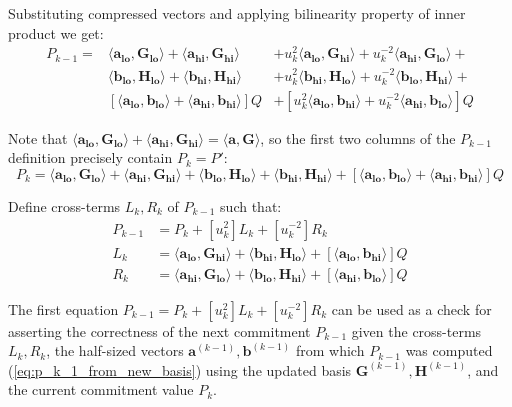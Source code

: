 \documentclass[../../book.tex]{subfiles}
\begin{document}
Substituting compressed vectors and applying bilinearity property of inner product we get:
\begin{align*}
    P_{k-1} = & \langle \mathbf{a_{lo}}, \mathbf{G_{lo}}\rangle + \langle \mathbf{a_{hi}}, \mathbf{G_{hi}}\rangle &+ u_k^2\langle \mathbf{a_{lo}}, \mathbf{G_{hi}}\rangle + u_k^{-2}\langle \mathbf{a_{hi}}, \mathbf{G_{lo}}\rangle + \\
    & \langle \mathbf{b_{lo}}, \mathbf{H_{lo}}\rangle + \langle \mathbf{b_{hi}}, \mathbf{H_{hi}}\rangle &+ u_k^2\langle \mathbf{b_{hi}}, \mathbf{H_{lo}}\rangle + u_k^{-2}\langle \mathbf{b_{lo}}, \mathbf{H_{hi}}\rangle + \\
    & [\langle \mathbf{a_{lo}}, \mathbf{b_{lo}}\rangle + \langle \mathbf{a_{hi}}, \mathbf{b_{hi}}\rangle]Q &+ [u_k^2\langle \mathbf{a_{lo}}, \mathbf{b_{hi}}\rangle + u_k^{-2}\langle \mathbf{a_{hi}}, \mathbf{b_{lo}}\rangle]Q
\end{align*}

Note that $\langle \mathbf{a_{lo}}, \mathbf{G_{lo}}\rangle + \langle \mathbf{a_{hi}}, \mathbf{G_{hi}}\rangle = \langle \mathbf{a,G}\rangle$, so the first two columns of the $P_{k-1}$ definition precisely contain $P_{k} = P'$:
$$P_{k} = \langle \mathbf{a_{lo}}, \mathbf{G_{lo}}\rangle + \langle \mathbf{a_{hi}}, \mathbf{G_{hi}}\rangle + \langle \mathbf{b_{lo}}, \mathbf{H_{lo}}\rangle + \langle \mathbf{b_{hi}}, \mathbf{H_{hi}}\rangle + [\langle \mathbf{a_{lo}}, \mathbf{b_{lo}}\rangle + \langle \mathbf{a_{hi}}, \mathbf{b_{hi}}\rangle]Q$$

Define cross-terms $L_k, R_k$ of $P_{k-1}$ such that:
\begin{align*}
    P_{k-1} &= P_k + [u_k^2] L_k + [u_k^{-2}] R_k \\
    L_{k} &= \langle \mathbf{a_{lo}}, \mathbf{G_{hi}}\rangle + \langle \mathbf{b_{hi}}, \mathbf{H_{lo}}\rangle + [\langle \mathbf{a_{lo}}, \mathbf{b_{hi}}\rangle]Q \\
    R_{k} &= \langle \mathbf{a_{hi}}, \mathbf{G_{lo}}\rangle + \langle \mathbf{b_{lo}}, \mathbf{H_{hi}}\rangle + [\langle \mathbf{a_{hi}}, \mathbf{b_{lo}}\rangle]Q
\end{align*}

The first equation $P_{k-1} = P_k + [u_k^2] L_k + [u_k^{-2}] R_k$ can be used as a check for asserting the correctness of the next commitment $P_{k-1}$ given the cross-terms $L_k, R_k$, the half-sized vectors $\mathbf{a}^{(k-1)}, \mathbf{b}^{(k-1)}$ from which $P_{k-1}$ was computed (\ref{eq:p_k_1_from_new_basis}) using the updated basis $\mathbf{G}^{(k-1)}, \mathbf{H}^{(k-1)}$, and the current commitment value $P_k$.
\end{document}
